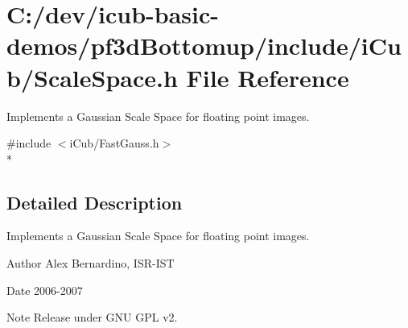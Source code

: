 \section{C\+:/dev/icub-\/basic-\/demos/pf3d\+Bottomup/include/i\+Cub/\+Scale\+Space.h File Reference}
\label{ScaleSpace_8h}


Implements a Gaussian Scale Space for floating point images.  


{\ttfamily \#include $<$i\+Cub/\+Fast\+Gauss.\+h$>$}\\*


\subsection{Detailed Description}
Implements a Gaussian Scale Space for floating point images. 

\begin{DoxyAuthor}{Author}
Alex Bernardino, I\+S\+R-\/\+I\+ST 
\end{DoxyAuthor}
\begin{DoxyDate}{Date}
2006-\/2007 
\end{DoxyDate}
\begin{DoxyNote}{Note}
Release under G\+NU G\+PL v2. 
\end{DoxyNote}

